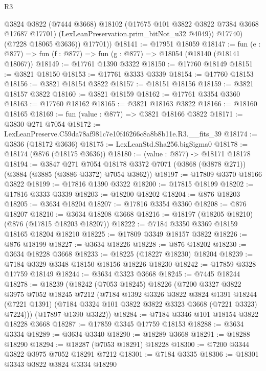 \begin{lexlean}{R3}
\begin{coremodule}
              @3824
              @3822
              (@7444 @3668)
              @18102
              (@17675 @101 @3822 @3822 @7384 @3668 @17687 @17701)
              (LexLeanPreservation.prim_bitNot_u32 @4049))
            @17740)
          (@7228 @18065 @3636))
        @17701))
@18141 := @17951 @18059
@18147 := fun (e : @877) => fun (f : @877) => fun (g : @877) => @18054 (@18140 (@18141 @18067))
@18149 := @17761 @1390 @3322
@18150 := @17760 @18149
@18151 := @3821 @18150
@18153 := @17761 @3333 @3339
@18154 := @17760 @18153
@18156 := @3821 @18154 @3822
@18157 := @18151 @18156
@18159 := @3821 @18157 @3822
@18160 := @3821 @18159
@18162 := @17761 @3354 @3360
@18163 := @17760 @18162
@18165 := @3821 @18163 @3822
@18166 := @18160 @18165
@18169 := fun (value : @877) => @3821 @18166 @3822
@18171 := @3830 @271 @7054
@18172 := LexLeanPreserve.C59da78af981c7e10f46266c8a8b8b11e.R3.__fits_39
@18174 := @3836 (@18172 @3636)
@18175 := LexLeanStd.Sha256.bigSigma0
@18178 := @18174 (@876 (@18175 @3636))
@18180 := (value : @877) -> @18171 @18178
@18194 := @3847
    @271
    @7054
    @18178
    @3372
    @7071
    (@3868 (@3878 @271))
    (@3884 (@3885 (@3886 @3372) @7054 @3862))
@18197 := @17809 @3370 @18166 @3822
@18199 := @17816 @1390 @3322
@18200 := @17815 @18199
@18202 := @17816 @3333 @3339
@18203 := @18200 @18202
@18204 := @876 @18203
@18205 := @3634 @18204
@18207 := @17816 @3354 @3360
@18208 := @876 @18207
@18210 := @3634 @18208 @3668
@18216 := @18197 (@18205 @18210) (@876 (@17815 @18203 @18207))
@18222 := @7184 @3350 @3369 @18159 @18165 @18204 @18210
@18225 := @17809 @3349 @18157 @3822
@18226 := @876 @18199
@18227 := @3634 @18226
@18228 := @876 @18202
@18230 := @3634 @18228 @3668
@18233 := @18225 (@18227 @18230) @18204
@18239 := @7184 @3329 @3348 @18150 @18156 @18226 @18230
@18242 := @17859 @3328 @17759 @18149
@18244 := @3634 @3323 @3668
@18245 := @7445 @18244
@18278 := @18239
    (@18242
      (@7053 @18245)
      @18226
      (@7200
        @3327
        @3822
        @3975
        @7052
        @18245
        @7212
        (@7184
          @1392
          @3326
          @3822
          @3824
          @1391
          @18244
          (@7221 @1391)
          (@7184 @3324 @101 @3822 @3822 @3323 @3668 (@7221 @3323) @7224)))
      (@17897 @1390 @3322))
@18284 := @7184 @3346 @101 @18154 @3822 @18228 @3668
@18287 := @17859 @3345 @17759 @18153
@18288 := @3634 @3334
@18289 := @3634 @3340
@18290 := @18289 @3668
@18291 := @18288 @18290
@18294 := @18287 (@7053 @18291) @18228
@18300 := @7200 @3344 @3822 @3975 @7052 @18291 @7212
@18301 := @7184 @3335
@18306 := @18301 @3343 @3822 @3824 @3334 @18290

\end{coremodule}
\end{lexlean}
